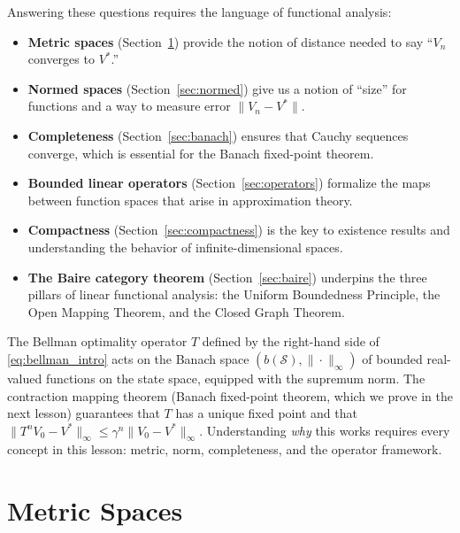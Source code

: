 \documentclass[11pt,a4paper]{article}
\theoremstyle{definition}
\theoremstyle{plain}
\theoremstyle{remark}
\begin{document}
Answering these questions requires the language of functional analysis:

\begin{itemize}[nosep]
    \item \textbf{Metric spaces} (Section~\ref{sec:metric}) provide the notion of
    distance needed to say ``$V_n$ converges to $V^*$.''
    \item \textbf{Normed spaces} (Section~\ref{sec:normed}) give us a notion of
    ``size'' for functions and a way to measure error $\|V_n - V^*\|$.
    \item \textbf{Completeness} (Section~\ref{sec:banach}) ensures that Cauchy
    sequences converge, which is essential for the Banach fixed-point theorem.
    \item \textbf{Bounded linear operators} (Section~\ref{sec:operators}) formalize
    the maps between function spaces that arise in approximation theory.
    \item \textbf{Compactness} (Section~\ref{sec:compactness}) is the key to
    existence results and understanding the behavior of infinite-dimensional spaces.
    \item \textbf{The Baire category theorem} (Section~\ref{sec:baire}) underpins
    the three pillars of linear functional analysis: the Uniform Boundedness
    Principle, the Open Mapping Theorem, and the Closed Graph Theorem.
\end{itemize}

\begin{rlconnection}
The Bellman optimality operator $T$ defined by the right-hand side of
\eqref{eq:bellman_intro} acts on the Banach space $(b(\mathcal{S}), \|\cdot\|_\infty)$
of bounded real-valued functions on the state space, equipped with the supremum
norm. The contraction mapping theorem (Banach fixed-point theorem, which we prove
in the next lesson) guarantees that $T$ has a unique fixed point and that
$\|T^n V_0 - V^*\|_\infty \le \gamma^n \|V_0 - V^*\|_\infty$. Understanding
\emph{why} this works requires every concept in this lesson: metric, norm,
completeness, and the operator framework.
\end{rlconnection}

\section{Metric Spaces}
\label{sec:metric}
\end{document}
